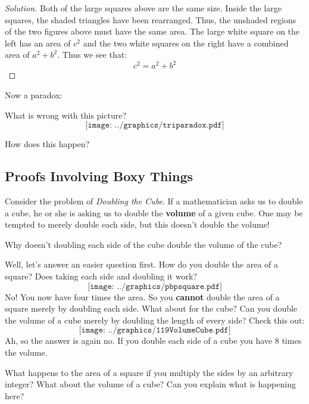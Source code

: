 \begin{proof}[Solution] Both of the large squares above are the same size. Inside the large squares, the shaded triangles have been rearranged.  Thus, the unshaded regions of the two figures above must have the same area. The large white square on the left has an area of $c^2$ and the two white squares on the right have a combined area of $a^2 + b^2$. Thus we see that:
\[
c^2 = a^2 + b^2
\]
\end{proof}


Now a paradox:

\begin{paradox} What is wrong with this picture?
\[
\texttt{[image: ../graphics/triparadox.pdf]}
\]
\end{paradox}

\begin{question} 
How does this happen?   
\end{question}
\QM

\subsection{Proofs Involving Boxy Things}

Consider the problem of \textit{Doubling the Cube}. If a mathematician asks us to double a cube, he or she is asking us to double the \textbf{volume} of a given cube. One may be tempted to merely double each side, but this doesn't double the volume! 

\begin{question} Why doesn't doubling each side of the cube double the volume of the cube? 
\end{question}
\QM

Well, let's answer an easier question first. How do you double the area of a square? Does taking each side and doubling it work? 
\[
\texttt{[image: ../graphics/pbpsquare.pdf]}
\]
No!  You now have four times the area. So you \textbf{cannot} double the area of a square merely by doubling each side.
What about for the cube? Can you double the volume of a cube merely by doubling the length of every side? Check this out:
\[
\texttt{[image: ../graphics/119VolumeCube.pdf]}
\]
Ah, so the answer is again no. If you double each side of a cube you have $8$ times the volume.

\begin{question}
What happens to the area of a square if you multiply the sides by an
arbitrary integer? What about the volume of a cube? Can you explain
what is happening here?
\end{question} 
\QM



